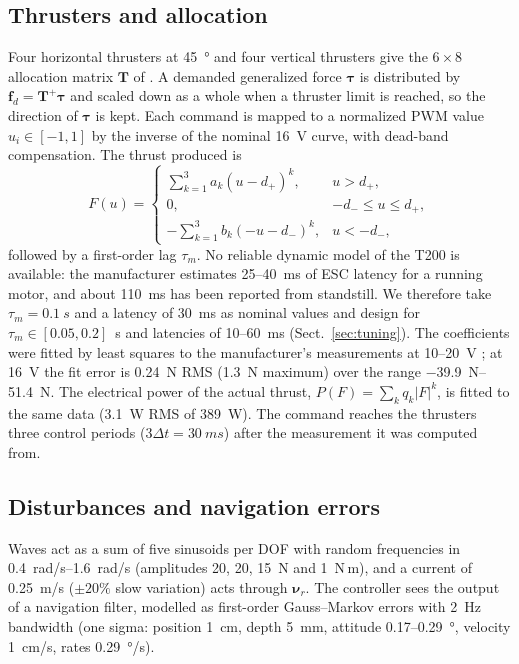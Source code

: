 \documentclass[review,12pt]{elsarticle}
\newcommand{\bnu}{\boldsymbol{\nu}}
\newcommand{\btau}{\boldsymbol{\tau}}
\begin{document}
\subsection{Thrusters and allocation}
Four horizontal thrusters at \SI{45}{\degree} and four vertical thrusters give the $6\times 8$ allocation
matrix $\boldsymbol{T}$ of \cite{vonbenzon2022}. A demanded generalized force $\btau$ is distributed by
$\boldsymbol{f}_d=\boldsymbol{T}^{+}\btau$ and scaled down as a whole when a thruster limit is reached, so
the direction of $\btau$ is kept. Each command is mapped to a normalized PWM value $u_i\in[-1,1]$ by the
inverse of the nominal \SI{16}{V} curve, with dead-band compensation. The thrust produced is
\begin{equation}
  F(u)=\begin{cases} \sum_{k=1}^{3} a_k (u-d_+)^k, & u>d_+,\\ 0, & -d_-\le u\le d_+,\\
  -\sum_{k=1}^{3} b_k (-u-d_-)^k, & u<-d_-,\end{cases}
\end{equation}
followed by a first-order lag $\tau_m$. No reliable dynamic model of the T200 is available: the
manufacturer estimates 25--40~ms of ESC latency for a running motor, and about 110~ms has been reported from
standstill. We therefore take $\tau_m=\SI{0.1}{s}$ and a latency of \SI{30}{ms} as nominal values and
design for $\tau_m\in[0.05,0.2]$~s and latencies of 10--60~ms (Sect.~\ref{sec:tuning}). The coefficients were fitted by least squares to the manufacturer's
measurements at 10--20~V \cite{t200data}; at \SI{16}{V} the fit error is \SI{0.24}{N} RMS (\SI{1.3}{N}
maximum) over the range \SIrange{-39.9}{51.4}{N}. The electrical power of the actual thrust,
$P(F)=\sum_k q_k|F|^k$, is fitted to the same data (\SI{3.1}{W} RMS of \SI{389}{W}). The command reaches the
thrusters three control periods ($3\Delta t=\SI{30}{ms}$) after the measurement it was computed from.

\subsection{Disturbances and navigation errors}
Waves act as a sum of five sinusoids per DOF with random frequencies in \SIrange{0.4}{1.6}{rad/s}
(amplitudes 20, 20, 15~N and 1~N\,m), and a current of \SI{0.25}{m/s} ($\pm 20\%$ slow variation)
acts through $\bnu_r$. The controller sees the output of a navigation filter, modelled as first-order
Gauss--Markov errors with \SI{2}{Hz} bandwidth (one sigma: position \SI{1}{cm}, depth \SI{5}{mm},
attitude 0.17--\SI{0.29}{\degree}, velocity \SI{1}{cm/s}, rates \SI{0.29}{\degree/s}).
\end{document}
